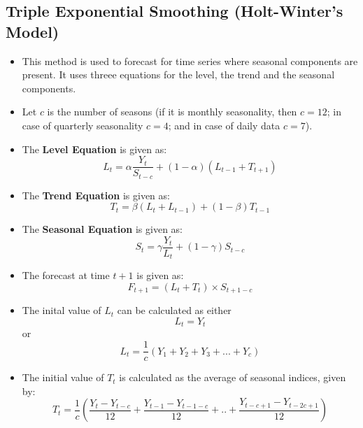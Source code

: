\documentclass{article}
\theoremstyle{plain}
\theoremstyle{definition}
\begin{document}
\subsection{Triple Exponential Smoothing (Holt-Winter's Model)}
\begin{itemize}
    \item This method is used to forecast for time series where seasonal components are present. It uses threee equations for the level, the trend and the seasonal components.  
    
    \item Let $c$ is the number of seasons (if it is monthly seasonality, then $c = 12$; in case of quarterly seasonality $c = 4$; and in case of daily data $c = 7$).
    
    \item The \textbf{Level Equation} is given as:
    \begin{equation}
        L_t = \alpha \frac{Y_t}{S_{t-c}} + (1-\alpha) (L_{t-1} + T_{t+1})
    \end{equation}
    
    \item The \textbf{Trend Equation} is given as:
    \begin{equation}
        T_t = \beta (L_{t} + L_{t-1}) + (1-\beta) T_{t-1}
    \end{equation}
    
    \item The \textbf{Seasonal Equation} is given as:
    \begin{equation}
        S_t = \gamma \frac{Y_t}{L_t} + (1-\gamma) S_{t-c}
    \end{equation}
    
    \item The forecast at time $t+1$ is given as:
    \begin{equation}
        F_{t+1} = (L_t + T_t)\times S_{t+1-c}
    \end{equation}
    
    \item The inital value of $L_t$ can be calculated as either
    \begin{equation*}
        L_t = Y_t
    \end{equation*}
    or
    \begin{equation*}
        L_t = \frac{1}{c} (Y_1 + Y_2 + Y_3 + ... + Y_c)
    \end{equation*}
    
    \item The initial value of $T_t$ is calculated as the average of seasonal indices, given by:
    \begin{equation*}
        T_t = \frac{1}{c} \left ( \frac{Y_t - Y_{t-c}}{12} + \frac{Y_{t-1} - Y_{t-1-c}}{12} + .. + \frac{Y_{t-c+1} - Y_{t-2c+1}}{12} \right )
    \end{equation*}
    

\end{itemize}
\end{document}
